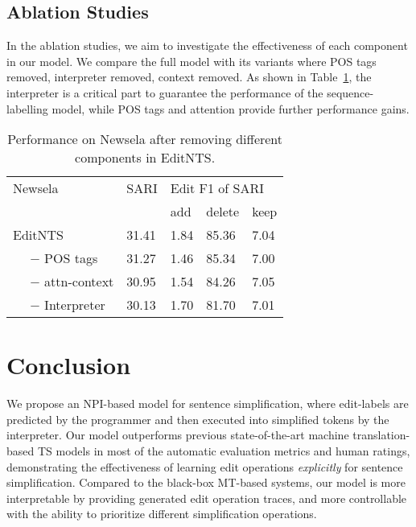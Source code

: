 \documentclass[11pt,a4paper]{article}
\def\editnet{EditNTS}
\begin{document}
\subsection{Ablation Studies} 
\label{sec:ablation}
In the ablation studies, we aim to investigate the effectiveness of each component in our model. We compare the full model with its variants where POS tags removed, interpreter removed, context removed. As shown in Table~\ref{table:ablation1}, the interpreter is a critical part to guarantee the performance of the sequence-labelling model, while POS tags and attention  provide further performance gains. \begin{table}[h] 
 \centering
\small 
\begin{tabular}{l|l|lll}
\toprule
Newsela & SARI & \multicolumn{3}{l}{Edit F1 of SARI}  \\
 &  & add & delete & keep   \\ \midrule
\editnet{} & 31.41 &1.84 & 85.36 & 7.04  \\
~~ $-$ POS tags  & 31.27 & 1.46 & 85.34 & 7.00 \\
~~ $-$ attn-context & 30.95 & 1.54 & 84.26 & 7.05 \\
~~ $-$ Interpreter  & 30.13 & 1.70 & 81.70 & 7.01  \\
\bottomrule
\end{tabular}
\caption{Performance on Newsela after removing different components in \editnet.}
\label{table:ablation1}
\end{table}



\section{Conclusion}




We propose an NPI-based model for sentence simplification, where edit-labels are predicted by the programmer and then executed into simplified tokens by the interpreter. Our model outperforms previous state-of-the-art machine translation-based TS models in most of the automatic evaluation metrics and human ratings, demonstrating the effectiveness of learning edit operations \textit{explicitly} for sentence simplification. Compared to the black-box MT-based systems, our model is more interpretable by providing generated edit operation traces, and more controllable with the ability to prioritize different simplification operations. 
\end{document}
